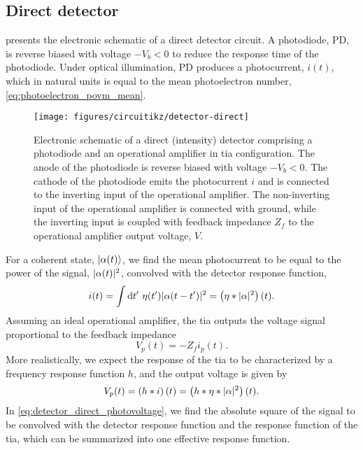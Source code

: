 \FloatBarrier
\subsection{Direct detector}

 presents the electronic schematic of a direct detector circuit.
A photodiode, PD, is reverse biased with voltage $-V_b<0$ to reduce the response time of the photodiode.
Under optical illumination, PD produces a photocurrent, $i(t)$, which in natural units is equal to the mean photoelectron number, \cref{eq:photoelectron_povm_mean}.
\begin{figure}[htb]
    \centering
    \texttt{[image: figures/circuitikz/detector-direct]}
    \caption{Electronic schematic of a direct (intensity) detector comprising a photodiode and an operational amplifier in \gls{tia} configuration. The anode of the photodiode is reverse biased with voltage $-V_b<0$. The cathode of the photodiode emits the photocurrent $i$ and is connected to the inverting input of the operational amplifier. The non-inverting input of the operational amplifier is connected with ground, while the inverting input is coupled with feedback impedance $Z_f$ to the operational amplifier output voltage, $V$.}\label{fig:detector_direct}
\end{figure}
For a coherent state, $\lvert\alpha(t)\rangle$, we find the mean photocurrent to be equal to the power of the signal, $\lvert\alpha(t)\rvert^2$, convolved with the detector response function,
\begin{equation}
	i(t)
	=
	\int\dd{t^\prime}
	\eta(t^\prime)
	\abs{\alpha(t-t^\prime)}^2
	=
	\left(\eta\conv\abs{\alpha}^2\right)(t)
	\label{eq:detector_direct_photocurrent}
	.
\end{equation}
Assuming an ideal operational amplifier, the \gls{tia} outputs the voltage signal proportional to the feedback impedance
\begin{equation}
	V_p(t)
	=
	-
	Z_f
	i_p(t)
	.
\end{equation}
More realistically, we expect the response of the \gls{tia} to be characterized by a frequency response function $h$, and the output voltage is given by
\begin{equation}
	V_p(t)
	=
	\left(h\ast i\right)(t)
	=
	\left(h\ast\eta\ast\lvert\alpha\rvert^2\right)(t)
	\label{eq:detector_direct_photovoltage}
	.
\end{equation}
In \cref{eq:detector_direct_photovoltage}, we find the absolute square of the signal to be convolved with the detector response function and the response function of the \gls{tia}, which can be summarized into one effective response function.

